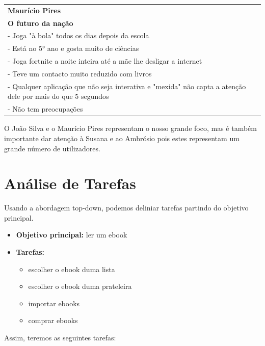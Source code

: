 \documentclass[11pt]{article}
\begin{document}
	\begin{tabularx}{\textwidth}{|X|}
		\hline
		\textbf{Maurício Pires} \\
		\textbf{O futuro da nação} \\
		\hline
		\hspace{5mm} - Joga "à bola" todos os dias depois da escola \\
		\hspace{5mm} - Está no 5° ano e gosta muito de ciências \\
		\hspace{5mm} - Joga fortnite a noite inteira até a mãe lhe desligar a internet \\
		\hspace{5mm} - Teve um contacto muito reduzido com livros \\
		\hspace{5mm} - Qualquer aplicação que não seja interativa e "mexida" não capta a atenção dele por mais do que 5 segundos \\
		\hspace{5mm} - Não tem preocupações \\
		\hline
	\end{tabularx}	

	O João Silva e o Maurício Pires representam o nosso grande foco, mas é também importante dar atenção à Susana e ao Ambrósio pois estes representam um grande número de utilizadores.

	
	\large
	\section{Análise de Tarefas}
	\normalsize
	
	Usando a abordagem top-down, podemos deliniar tarefas partindo do objetivo principal.
	
	\begin{itemize}
		\item \textbf{Objetivo principal:} ler um ebook
		\item \textbf{Tarefas:}
		\begin{itemize}
			\item escolher o ebook duma lista
			\item escolher o ebook duma prateleira
			\item importar ebooks
			\item comprar ebooks
		\end{itemize}
	\end{itemize}
	
	Assim, teremos as seguintes tarefas:
	
\end{document}
